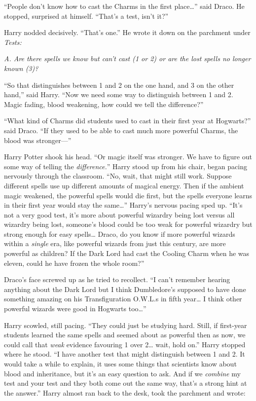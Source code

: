 ``People don't know how to cast the Charms in the first place\ldots{}''
said Draco. He stopped, surprised at himself. ``That's a test, isn't
it?''

Harry nodded decisively. ``That's one.'' He wrote it down on the
parchment under \emph{Tests:}

\emph{A. Are there spells we know but can't cast (1 or 2) or are the
lost spells no longer known (3)?}

``So that distinguishes between 1 and 2 on the one hand, and 3 on the
other hand,'' said Harry. ``Now we need some way to distinguish between
1 and 2. Magic fading, blood weakening, how could we tell the
difference?''

``What kind of Charms did students used to cast in their first year at
Hogwarts?'' said Draco. ``If they used to be able to cast much more
powerful Charms, the blood was stronger---''

Harry Potter shook his head. ``Or magic itself was stronger. We have to
figure out some way of telling the \emph{difference.}'' Harry stood up
from his chair, began pacing nervously through the classroom. ``No,
wait, that might still work. Suppose different spells use up different
amounts of magical energy. Then if the ambient magic weakened, the
powerful spells would die first, but the spells everyone learns in their
first year would stay the same\ldots{}'' Harry's nervous pacing sped up.
``It's not a very good test, it's more about powerful wizardry being
lost versus all wizardry being lost, someone's blood could be too weak
for powerful wizardry but strong enough for easy spells\ldots{} Draco,
do you know if more powerful wizards within a \emph{single} era, like
powerful wizards from just this century, are more powerful as children?
If the Dark Lord had cast the Cooling Charm when he was eleven, could he
have frozen the whole room?''

Draco's face screwed up as he tried to recollect. ``I can't remember
hearing anything about the Dark Lord but I think Dumbledore's supposed
to have done something amazing on his Transfiguration O.W.L.s in fifth
year\ldots{} I think other powerful wizards were good in Hogwarts
too\ldots{}''

Harry scowled, still pacing. ``They could just be studying hard. Still,
if first-year students learned the same spells and seemed about as
powerful then as now, we could call that \emph{weak} evidence favouring
1 over 2\ldots{} wait, hold on.'' Harry stopped where he stood. ``I have
another test that might distinguish between 1 and 2. It would take a
while to explain, it uses some things that scientists know about blood
and inheritance, but it's an easy question to ask. And if we
\emph{combine} my test and your test and they both come out the same
way, that's a strong hint at the answer.'' Harry almost ran back to the
desk, took the parchment and wrote:

